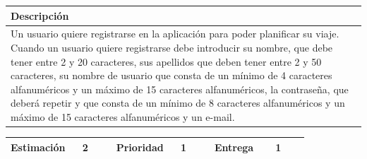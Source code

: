 \documentclass[11pt]{article}
\begin{document}
  \begin{longtable}{p{1.028\linewidth}}
    \textbf{Descripción}\\
    \midrule
    Un usuario quiere registrarse en la aplicación para poder planificar su viaje. Cuando un usuario quiere registrarse debe introducir su nombre, que debe tener entre 2 y 20 caracteres, sus apellidos que deben tener entre 2 y 50 caracteres, su nombre de usuario que consta de un mínimo de 4 caracteres alfanuméricos y un máximo de 15 caracteres alfanuméricos, la contraseña, que deberá repetir y que consta de un mínimo de 8 caracteres alfanuméricos y un máximo de 15 caracteres alfanuméricos y un e-mail.
  \end{longtable}

  \begin{longtable}{p{0.18\linewidth}|p{0.1\linewidth}|p{0.18\linewidth}|p{0.1\linewidth}|p{0.18\linewidth}|p{0.1\linewidth}}
    \toprule
    \textbf{Estimación} & 2 & \textbf{Prioridad} & 1 & \textbf{Entrega} & 1\\
    \bottomrule
  \end{longtable}
\end{document}
